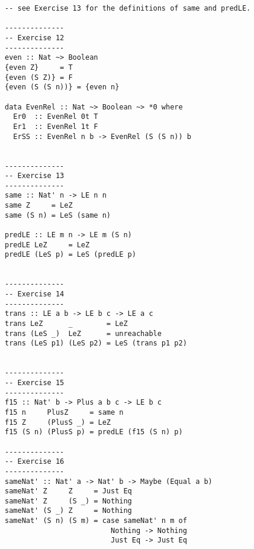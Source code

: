 \documentclass[11pt,twoside,A4]{llncs}
\begin{document}
{\begin{verbatim}
-- see Exercise 13 for the definitions of same and predLE.

--------------
-- Exercise 12
--------------
even :: Nat ~> Boolean
{even Z}     = T
{even (S Z)} = F
{even (S (S n))} = {even n}

data EvenRel :: Nat ~> Boolean ~> *0 where
  Er0  :: EvenRel 0t T
  Er1  :: EvenRel 1t F
  ErSS :: EvenRel n b -> EvenRel (S (S n)) b


--------------
-- Exercise 13
--------------
same :: Nat' n -> LE n n
same Z     = LeZ
same (S n) = LeS (same n)

predLE :: LE m n -> LE m (S n)
predLE LeZ     = LeZ
predLE (LeS p) = LeS (predLE p)


--------------
-- Exercise 14
--------------
trans :: LE a b -> LE b c -> LE a c
trans LeZ      _        = LeZ
trans (LeS _)  LeZ      = unreachable
trans (LeS p1) (LeS p2) = LeS (trans p1 p2)


--------------
-- Exercise 15
--------------
f15 :: Nat' b -> Plus a b c -> LE b c
f15 n     PlusZ     = same n
f15 Z     (PlusS _) = LeZ
f15 (S n) (PlusS p) = predLE (f15 (S n) p)

--------------
-- Exercise 16
--------------
sameNat' :: Nat' a -> Nat' b -> Maybe (Equal a b)
sameNat' Z     Z     = Just Eq
sameNat' Z     (S _) = Nothing
sameNat' (S _) Z     = Nothing
sameNat' (S n) (S m) = case sameNat' n m of
                         Nothing -> Nothing
                         Just Eq -> Just Eq 
\end{verbatim}}
\end{document}
